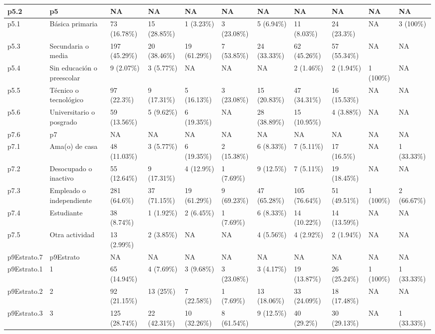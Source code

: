 \begin{table}
{\begin{tabular}[t]{l|l|l|l|l|l|l|l|l|l|l}
\hline
p5.2 & p5 & NA & NA & NA & NA & NA & NA & NA & NA & NA\\
\hline
p5.1 & Básica primaria & 73 (16.78\%) & 15 (28.85\%) & 1 (3.23\%) & 3 (23.08\%) & 5 (6.94\%) & 11 (8.03\%) & 24 (23.3\%) & NA & 3 (100\%)\\
\hline
p5.3 & Secundaria o media & 197 (45.29\%) & 20 (38.46\%) & 19 (61.29\%) & 7 (53.85\%) & 24 (33.33\%) & 62 (45.26\%) & 57 (55.34\%) & NA & NA\\
\hline
p5.4 & Sin educación o preescolar & 9 (2.07\%) & 3 (5.77\%) & NA & NA & NA & 2 (1.46\%) & 2 (1.94\%) & 1 (100\%) & NA\\
\hline
p5.5 & Técnico o tecnológico & 97 (22.3\%) & 9 (17.31\%) & 5 (16.13\%) & 3 (23.08\%) & 15 (20.83\%) & 47 (34.31\%) & 16 (15.53\%) & NA & NA\\
\hline
p5.6 & Universitario o posgrado & 59 (13.56\%) & 5 (9.62\%) & 6 (19.35\%) & NA & 28 (38.89\%) & 15 (10.95\%) & 4 (3.88\%) & NA & NA\\
\hline
p7.6 & p7 & NA & NA & NA & NA & NA & NA & NA & NA & NA\\
\hline
p7.1 & Ama(o) de casa & 48 (11.03\%) & 3 (5.77\%) & 6 (19.35\%) & 2 (15.38\%) & 6 (8.33\%) & 7 (5.11\%) & 17 (16.5\%) & NA & 1 (33.33\%)\\
\hline
p7.2 & Desocupado o inactivo & 55 (12.64\%) & 9 (17.31\%) & 4 (12.9\%) & 1 (7.69\%) & 9 (12.5\%) & 7 (5.11\%) & 19 (18.45\%) & NA & NA\\
\hline
p7.3 & Empleado o independiente & 281 (64.6\%) & 37 (71.15\%) & 19 (61.29\%) & 9 (69.23\%) & 47 (65.28\%) & 105 (76.64\%) & 51 (49.51\%) & 1 (100\%) & 2 (66.67\%)\\
\hline
p7.4 & Estudiante & 38 (8.74\%) & 1 (1.92\%) & 2 (6.45\%) & 1 (7.69\%) & 6 (8.33\%) & 14 (10.22\%) & 14 (13.59\%) & NA & NA\\
\hline
p7.5 & Otra actividad & 13 (2.99\%) & 2 (3.85\%) & NA & NA & 4 (5.56\%) & 4 (2.92\%) & 2 (1.94\%) & NA & NA\\
\hline
p9Estrato.7 & p9Estrato & NA & NA & NA & NA & NA & NA & NA & NA & NA\\
\hline
p9Estrato.1 & 1 & 65 (14.94\%) & 4 (7.69\%) & 3 (9.68\%) & 3 (23.08\%) & 3 (4.17\%) & 19 (13.87\%) & 26 (25.24\%) & 1 (100\%) & 1 (33.33\%)\\
\hline
p9Estrato.2 & 2 & 92 (21.15\%) & 13 (25\%) & 7 (22.58\%) & 1 (7.69\%) & 13 (18.06\%) & 33 (24.09\%) & 18 (17.48\%) & NA & NA\\
\hline
p9Estrato.3 & 3 & 125 (28.74\%) & 22 (42.31\%) & 10 (32.26\%) & 8 (61.54\%) & 9 (12.5\%) & 40 (29.2\%) & 30 (29.13\%) & NA & 1 (33.33\%)\\

\end{tabular}}
\end{table}
